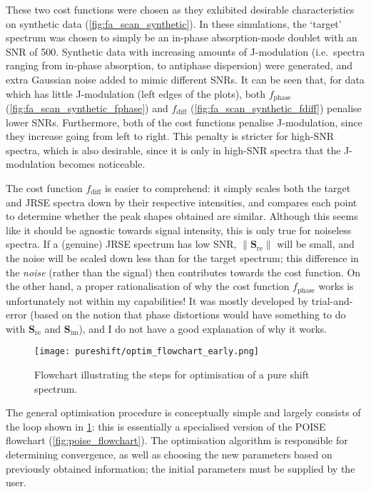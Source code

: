 These two cost functions were chosen as they exhibited desirable characteristics on synthetic data (\cref{fig:fa_scan_synthetic}).
In these simulations, the `target' spectrum was chosen to simply be an in-phase absorption-mode doublet with an SNR of 500.
Synthetic data with increasing amounts of J-modulation (i.e.\ spectra ranging from in-phase absorption, to antiphase dispersion) were generated, and extra Gaussian noise added to mimic different SNRs.
It can be seen that, for data which has little J-modulation (left edges of the plots), both $f_\text{phase}$ (\cref{fig:fa_scan_synthetic_fphase}) and $f_\text{diff}$ (\cref{fig:fa_scan_synthetic_fdiff}) penalise lower SNRs.
Furthermore, both of the cost functions penalise J-modulation, since they increase going from left to right.
This penalty is stricter for high-SNR spectra, which is also desirable, since it is only in high-SNR spectra that the J-modulation becomes noticeable.

The cost function $f_\text{diff}$ is easier to comprehend: it simply scales both the target and JRSE spectra down by their respective intensities, and compares each point to determine whether the peak shapes obtained are similar.
Although this seems like it should be agnostic towards signal intensity, this is only true for noiseless spectra.
If a (genuine) JRSE spectrum has low SNR, $\lVert \symbf{S}_\text{re} \rVert$ will be small, and the noise will be scaled down less than for the target spectrum; this difference in the \textit{noise} (rather than the signal) then contributes towards the cost function.
On the other hand, a proper rationalisation of why the cost function $f_\text{phase}$ works is unfortunately not within my capabilities!
It was mostly developed by trial-and-error (based on the notion that phase distortions would have something to do with $\symbf{S}_\text{re}$ and $\symbf{S}_\text{im}$), and I do not have a good explanation of why it works.

\begin{figure}[htbp]
    \centering
    \texttt{[image: pureshift/optim\_flowchart\_early.png]}%
    \caption[Flowchart for pure shift optimisation process]{
        Flowchart illustrating the steps for optimisation of a pure shift spectrum.
    }
    \label{fig:optim_flowchart_early}
\end{figure}

The general optimisation procedure is conceptually simple and largely consists of the loop shown in \cref{fig:optim_flowchart_early}: this is essentially a specialised version of the POISE flowchart (\cref{fig:poise_flowchart}).
The optimisation algorithm is responsible for determining convergence, as well as choosing the new parameters based on previously obtained information; the initial parameters must be supplied by the user.

